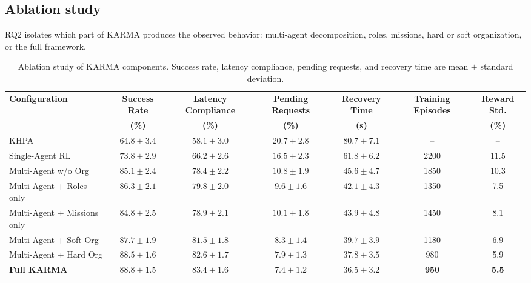 \documentclass[journal]{IEEEtran}
\begin{document}
\subsection{Ablation study}

RQ2 isolates which part of KARMA produces the observed behavior: multi-agent decomposition, roles, missions, hard or soft organization, or the full framework.

\begin{table}[t]
  \centering
  \caption{Ablation study of KARMA components. Success rate, latency compliance, pending requests, and recovery time are mean $\pm$ standard deviation.}
  \label{tab:ablation}
  \scriptsize
  \setlength{\tabcolsep}{3pt}
  \begin{tabular}{lcccccc}
    \toprule
    \textbf{Configuration}      & \textbf{Success Rate} & \textbf{Latency Compliance} & \textbf{Pending Requests} & \textbf{Recovery Time} & \textbf{Training Episodes} & \textbf{Reward Std.} \\
                                & \textbf{(\%)}         & \textbf{(\%)}               & \textbf{(\%)}             & \textbf{(s)}           &                            & \textbf{(\%)}        \\
    \midrule
    KHPA                        & $64.8\pm3.4$          & $58.1\pm3.0$                & $20.7\pm2.8$              & $80.7\pm7.1$           & --                         & --                   \\
    Single-Agent RL             & $73.8\pm2.9$          & $66.2\pm2.6$                & $16.5\pm2.3$              & $61.8\pm6.2$           & 2200                       & 11.5                 \\
    Multi-Agent w/o Org         & $85.1\pm2.4$          & $78.4\pm2.2$                & $10.8\pm1.9$              & $45.6\pm4.7$           & 1850                       & 10.3                 \\
    Multi-Agent + Roles only    & $86.3\pm2.1$          & $79.8\pm2.0$                & $9.6\pm1.6$               & $42.1\pm4.3$           & 1350                       & 7.5                  \\
    Multi-Agent + Missions only & $84.8\pm2.5$          & $78.9\pm2.1$                & $10.1\pm1.8$              & $43.9\pm4.8$           & 1450                       & 8.1                  \\
    Multi-Agent + Soft Org      & $87.7\pm1.9$          & $81.5\pm1.8$                & $8.3\pm1.4$               & $39.7\pm3.9$           & 1180                       & 6.9                  \\
    Multi-Agent + Hard Org      & $88.5\pm1.6$          & $82.6\pm1.7$                & $7.9\pm1.3$               & $37.8\pm3.5$           & 980                        & 5.9                  \\
    \textbf{Full KARMA}         & $\mathbf{88.8\pm1.5}$ & $\mathbf{83.4\pm1.6}$       & $\mathbf{7.4\pm1.2}$      & $\mathbf{36.5\pm3.2}$  & \textbf{950}               & \textbf{5.5}         \\
    \bottomrule
  \end{tabular}
\end{table}
\end{document}
